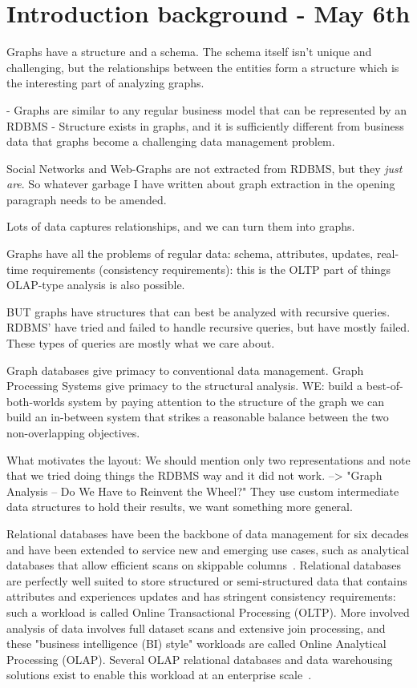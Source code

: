 \chapter{Introduction background - May 6th}

Graphs have a structure and a schema. The schema itself isn't unique and challenging, but the relationships between the entities form a structure which is the interesting part of analyzing graphs. 

- Graphs are similar to any regular business model that can be represented by an RDBMS
- Structure exists in graphs, and it is sufficiently different from business data that graphs become a challenging data management problem.

Social Networks and Web-Graphs are not extracted from RDBMS, but they \emph{just are}. So whatever garbage I have written about graph extraction in the opening paragraph needs to be amended. 

Lots of data captures relationships, and we can turn them into graphs. 

Graphs have all the problems of regular data: schema, attributes, updates, real-time requirements (consistency requirements): this is the OLTP part of things
OLAP-type analysis is also possible. 

BUT graphs have structures that can best be analyzed with recursive queries.
RDBMS' have tried and failed to handle recursive queries, but have mostly failed. These types of queries are mostly what we care about. 

Graph databases give primacy to conventional data management.
Graph Processing Systems give primacy to the structural analysis.
WE: build a best-of-both-worlds system by paying attention to the structure of the graph we can build an in-between system that strikes a reasonable balance between the two non-overlapping objectives. 

What motivates the layout:
We should mention only two representations and note that we tried doing things the RDBMS way and it did not work. --> "Graph Analysis – Do We Have to Reinvent the Wheel?" They use custom intermediate data structures to hold their results, we want something more general. 


Relational databases have been the backbone of data management for six decades and have been extended to service new and emerging use cases, such as analytical databases that allow efficient scans on skippable columns~\cite{stonebraker2018c,boncz2005monetdb}.
Relational databases are perfectly well suited to store structured or semi-structured data that contains attributes and experiences updates and has stringent consistency requirements: such a workload is called Online Transactional Processing (OLTP).
More involved analysis of data involves full dataset scans and extensive join processing, and these "business intelligence (BI) style" workloads are called Online Analytical Processing (OLAP).
Several OLAP relational databases and data warehousing solutions exist to enable this workload at an enterprise scale~\cite{Redshift2015,boncz2005monetdb,vertica, raasveldt2019duckdb}.


